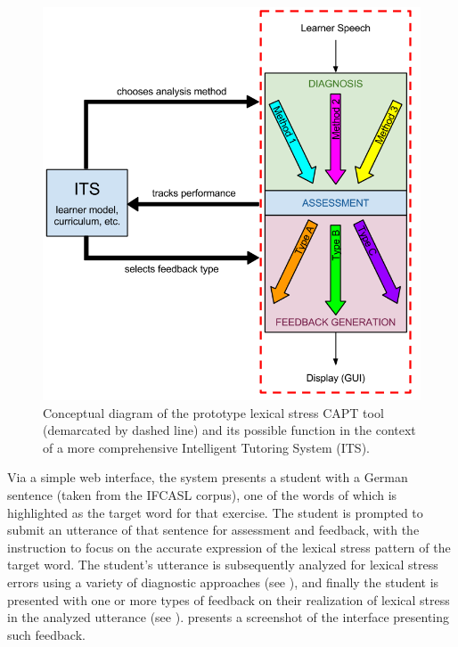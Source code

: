 	\begin{figure}[thb] 
		\centering
		\includegraphics[height=.45\textheight]{img/hourglass-ITS} 
		\caption[Conceptual diagram of the prototype lexical stress CAPT tool]{Conceptual diagram of the prototype lexical stress CAPT tool (demarcated by dashed line) and its possible function in the context of a more comprehensive Intelligent Tutoring System (ITS).}
		\label{fig:hourglass-ITS}
	\end{figure}

 Via a simple web interface, the system presents a student with a German sentence (taken from the IFCASL corpus), one of the words of which is highlighted as the target word for that exercise. The student is prompted to submit an utterance of that sentence for assessment and feedback, with the instruction to focus on the accurate expression of the lexical stress pattern of the target word. The student's utterance is subsequently analyzed for lexical stress errors using a variety of diagnostic approaches (see ), and finally the student is presented with one or more types of feedback on their realization of lexical stress in the analyzed utterance (see ).  presents a screenshot of the interface presenting such feedback.

